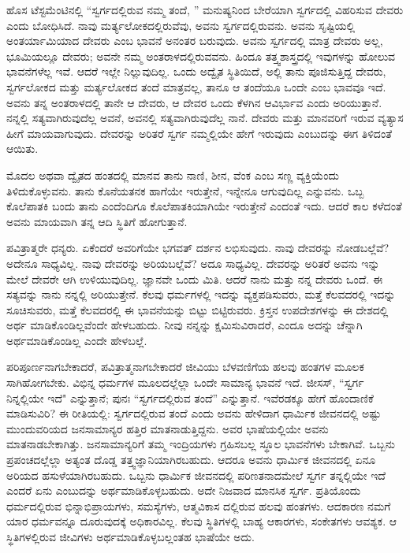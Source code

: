 ಹೊಸ ಟೆಸ್ಟಮೆಂಟಿನಲ್ಲಿ “ಸ್ವರ್ಗದಲ್ಲಿರುವ ನಮ್ಮ ತಂದೆ, '' ಮನುಷ್ಯನಿಂದ ಬೇರೆಯಾಗಿ ಸ್ವರ್ಗದಲ್ಲಿ ವಿಹರಿಸುವ ದೇವರು ಎಂದು ಬೋಧಿಸಿದೆ. ನಾವು ಮರ್ತ್ಯಲೋಕದಲ್ಲಿರುವೆವು, ಅವನು ಸ್ವರ್ಗದಲ್ಲಿರುವನು. ಅವನು ಸೃಷ್ಟಿಯಲ್ಲಿ ಅಂತರ್ಯಾಮಿಯಾದ ದೇವರು ಎಂಬ ಭಾವನೆ ಅನಂತರ ಬರುವುದು. ಅವನು ಸ್ವರ್ಗದಲ್ಲಿ ಮಾತ್ರ ದೇವರು ಅಲ್ಲ, ಭೂಮಿಯಲ್ಲೂ ದೇವರು; ಅವನೇ ನಮ್ಮ ಅಂತರಾಳದಲ್ಲಿರುವವನು. ಹಿಂದೂ ತತ್ತ್ವಶಾಸ್ತ್ರದಲ್ಲಿ ಇವುಗಳನ್ನು ಹೋಲುವ ಭಾವನೆಗಳೆಲ್ಲ ಇವೆ. ಆದರೆ ಇಲ್ಲೇ ನಿಲ್ಲುವುದಿಲ್ಲ. ಒಂದು ಅದ್ವೈತ ಸ್ಥಿತಿಯಿದೆ, ಅಲ್ಲಿ ತಾನು ಪೂಜಿಸುತ್ತಿದ್ದ ದೇವರು, ಸ್ವರ್ಗಲೋಕದ ಮತ್ತು ಮರ್ತ್ಯಲೋಕದ ತಂದೆ ಮಾತ್ರವಲ್ಲ, ತಾನೂ ಆ ತಂದೆಯೂ ಒಂದೇ ಎಂಬ ಭಾವವೂ ಇದೆ. ಅವನು ತನ್ನ ಅಂತರಾಳದಲ್ಲಿ ತಾನೇ ಆ ದೇವರು, ಆ ದೇವರ ಒಂದು ಕೆಳಗಿನ ಆವಿರ್ಭಾವ ಎಂದು ಅರಿಯುತ್ತಾನೆ. ನನ್ನಲ್ಲಿ ಸತ್ಯವಾಗಿರುವುದೆಲ್ಲ ಅವನೆ, ಅವನಲ್ಲಿ ಸತ್ಯವಾಗಿರುವುದೆಲ್ಲ ನಾನೆ. ದೇವರು ಮತ್ತು ಮಾನವರಿಗೆ ಇರುವ ವ್ಯತ್ಯಾಸ ಹೀಗೆ ಮಾಯವಾಗುವುದು. ದೇವರನ್ನು ಅರಿತರೆ ಸ್ವರ್ಗ ನಮ್ಮಲ್ಲಿಯೇ ಹೇಗೆ ಇರುವುದು ಎಂಬುದನ್ನು ಈಗ ತಿಳಿದಂತೆ ಆಯಿತು.

ಮೊದಲ ಅಥವಾ ದ್ವೈತದ ಹಂತದಲ್ಲಿ ಮಾನವ ತಾನು ನಾಣಿ, ಶೀನ, ವೆಂಕ ಎಂಬ ಸಣ್ಣ ವ್ಯಕ್ತಿಯೆಂದು ತಿಳಿದುಕೊಳ್ಳುವನು. ತಾನು ಕೊನೆಯತನಕ ಹಾಗೆಯೇ ಇರುತ್ತೇನೆ, ಇನ್ನೇನೂ ಆಗುವುದಿಲ್ಲ ಎನ್ನುವನು. ಒಬ್ಬ ಕೊಲೆಪಾತಕಿ ಬಂದು ತಾನು ಎಂದೆಂದಿಗೂ ಕೊಲೆಪಾತಕಿಯಾಗಿಯೇ ಇರುತ್ತೇನೆ ಎಂದಂತೆ ಇದು. ಆದರೆ ಕಾಲ ಕಳೆದಂತೆ ಅವನು ಮಾಯವಾಗಿ ತನ್ನ ಆದಿ ಸ್ಥಿತಿಗೆ ಹೋಗುತ್ತಾನೆ.

ಪವಿತ್ರಾತ್ಮರೇ ಧನ್ಯರು. ಏಕೆಂದರೆ ಅವರಿಗೆಯೇ ಭಗವತ್ ದರ್ಶನ ಲಭಿಸುವುದು. ನಾವು ದೇವರನ್ನು ನೋಡಬಲ್ಲೆವೆ? ಅದೇನೂ ಸಾಧ್ಯವಿಲ್ಲ. ನಾವು ದೇವರನ್ನು ಅರಿಯಬಲ್ಲೆವೆ? ಅದೂ ಸಾಧ್ಯವಿಲ್ಲ. ದೇವರನ್ನು ಅರಿತರೆ ಅವನು ಇನ್ನು ಮೇಲೆ ದೇವರೇ ಆಗಿ ಉಳಿಯುವುದಿಲ್ಲ. ಜ್ಞಾನವೇ ಒಂದು ಮಿತಿ. ಆದರೆ ನಾನು ಮತ್ತು ನನ್ನ ದೇವರು ಒಂದೆ. ಈ ಸತ್ಯವನ್ನು ನಾನು ನನ್ನಲ್ಲಿ ಅರಿಯುತ್ತೇನೆ. ಕೆಲವು ಧರ್ಮಗಳಲ್ಲಿ ಇದನ್ನು ವ್ಯಕ್ತಪಡಿಸುವರು, ಮತ್ತೆ ಕೆಲವದರಲ್ಲಿ ಇದನ್ನು ಸೂಚಿಸುವರು, ಮತ್ತೆ ಕೆಲವದರಲ್ಲಿ ಈ ಭಾವನೆಯನ್ನು ಬಿಟ್ಟು ಬಿಟ್ಟಿರುವರು. ಕ್ರಿಸ್ತನ ಉಪದೇಶಗಳನ್ನು ಈ ದೇಶದಲ್ಲಿ ಅರ್ಥ ಮಾಡಿಕೊಂಡಿಲ್ಲವೆಂದೇ ಹೇಳಬಹುದು. ನೀವು ನನ್ನನ್ನು ಕ್ಷಮಿಸುವಿರಾದರೆ, ಎಂದೂ ಅದನ್ನು ಚೆನ್ನಾಗಿ ಅರ್ಥಮಾಡಿಕೊಂಡಿಲ್ಲ ಎಂದೇ ಹೇಳಬಲ್ಲೆ.

ಪರಿಪೂರ್ಣನಾಗಬೇಕಾದರೆ, ಪವಿತ್ರಾತ್ಮನಾಗಬೇಕಾದರೆ ಜೀವಿಯು ಬೆಳವಣಿಗೆಯ ಹಲವು ಹಂತಗಳ ಮೂಲಕ ಸಾಗಿಹೋಗಬೇಕು. ವಿಭಿನ್ನ ಧರ್ಮಗಳ ಮೂಲದಲ್ಲೆಲ್ಲಾ ಒಂದೇ ಸಾಮಾನ್ಯ ಭಾವನೆ ಇದೆ. ಜೀಸಸ್, “ಸ್ವರ್ಗ ನಿನ್ನಲ್ಲಿಯೇ ಇದೆ" ಎನ್ನುತ್ತಾನೆ; ಪುನಃ “ಸ್ವರ್ಗದಲ್ಲಿರುವ ತಂದೆ'' ಎನ್ನುತ್ತಾನೆ. ಇವೆರಡಕ್ಕೂ ಹೇಗೆ ಹೊಂದಾಣಿಕೆ ಮಾಡಿಸುವಿರಿ? ಈ ರೀತಿಯಲ್ಲಿ: ಸ್ವರ್ಗದಲ್ಲಿರುವ ತಂದೆ ಎಂದು ಅವನು ಹೇಳಿದಾಗ ಧಾರ್ಮಿಕ ಜೀವನದಲ್ಲಿ ಅಷ್ಟು ಮುಂದುವರಿಯದ ಜನಸಾಮಾನ್ಯರ ಹತ್ತಿರ ಮಾತನಾಡುತ್ತಿದ್ದನು. ಅವರ ಭಾಷೆಯಲ್ಲಿಯೇ ಅವನು ಮಾತನಾಡಬೇಕಾಗಿತ್ತು. ಜನಸಾಮಾನ್ಯರಿಗೆ ತಮ್ಮ ಇಂದ್ರಿಯಗಳು ಗ್ರಹಿಸಬಲ್ಲ ಸ್ಥೂಲ ಭಾವನೆಗಳು ಬೇಕಾಗಿವೆ. ಒಬ್ಬನು ಪ್ರಪಂಚದಲ್ಲೆಲ್ಲಾ ಅತ್ಯಂತ ದೊಡ್ಡ ತತ್ತ್ವಜ್ಞಾನಿಯಾಗಿರಬಹುದು. ಆದರೂ ಅವನು ಧಾರ್ಮಿಕ ಜೀವನದಲ್ಲಿ ಏನೂ ಅರಿಯದ ಹಸುಳೆಯಾಗಿರಬಹುದು. ಒಬ್ಬನು ಧಾರ್ಮಿಕ ಜೀವನದಲ್ಲಿ ಪರಿಣತನಾದಮೇಲೆ ಸ್ವರ್ಗ ತನ್ನಲ್ಲಿಯೇ ಇದೆ ಎಂದರೆ ಏನು ಎಂಬುದನ್ನು ಅರ್ಥಮಾಡಿಕೊಳ್ಳಬಹುದು. ಅದೇ ನಿಜವಾದ ಮಾನಸಿಕ ಸ್ವರ್ಗ. ಪ್ರತಿಯೊಂದು ಧರ್ಮದಲ್ಲಿರುವ ಭಿನ್ನಾಭಿಪ್ರಾಯಗಳು, ಸಮಸ್ಯೆಗಳು, ಆತ್ಮವಿಕಾಸ ದಲ್ಲಿರುವ ಹಲವು ಹಂತಗಳು. ಆದಕಾರಣ ನಮಗೆ ಯಾರ ಧರ್ಮವನ್ನೂ ದೂರುವುದಕ್ಕೆ ಅಧಿಕಾರವಿಲ್ಲ. ಕೆಲವು ಸ್ಥಿತಿಗಳಲ್ಲಿ ಬಾಹ್ಯ ಆಕಾರಗಳು, ಸಂಕೇತಗಳು ಆವಶ್ಯಕ. ಆ ಸ್ಥಿತಿಗಳಲ್ಲಿರುವ ಜೀವಿಗಳು ಅರ್ಥಮಾಡಿಕೊಳ್ಳಬಲ್ಲಂತಹ ಭಾಷೆಯೇ ಅದು.

